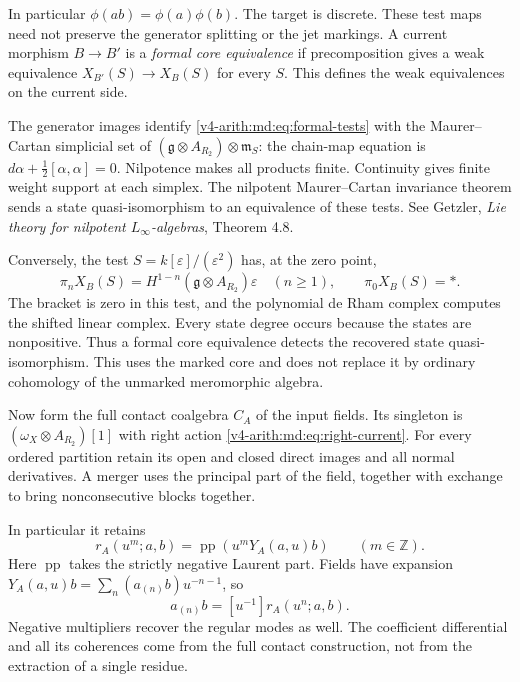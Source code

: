 In particular $\phi(ab)=\phi(a)\phi(b)$.
The target is discrete. These test maps need not
preserve the generator splitting or the jet markings.
A current morphism $B\to B'$ is a
\emph{formal core equivalence} if precomposition gives
a weak equivalence $X_{B'}(S)\to X_B(S)$ for every $S$.
This defines the weak equivalences on the current side.

The generator images identify
\eqref{v4-arith:md:eq:formal-tests} with the Maurer--Cartan
simplicial set of
$(\mathfrak g\otimes A_{R_2})\otimes\mathfrak m_S$:
the chain-map equation is $d\alpha+\tfrac12[\alpha,\alpha]=0$.
Nilpotence makes all products finite. Continuity gives
finite weight support at each simplex.
The nilpotent Maurer--Cartan invariance theorem sends a
state quasi-isomorphism to an equivalence of these tests.
See Getzler, \emph{Lie theory for nilpotent
$L_\infty$-algebras}, Theorem 4.8.

Conversely, the test $S=k[\varepsilon]/(\varepsilon^2)$
has, at the zero point,
\[
 \pi_nX_B(S)=H^{1-n}(\mathfrak g\otimes A_{R_2})\varepsilon
 \quad(n\geq1),\qquad\pi_0X_B(S)=*.
\]
The bracket is zero in this test, and the polynomial
de Rham complex computes the shifted linear complex.
Every state degree occurs because the states are
nonpositive. Thus a formal core equivalence detects
the recovered state quasi-isomorphism. This uses the
marked core and does not replace it by ordinary
cohomology of the unmarked meromorphic algebra.

Now form the full contact coalgebra $C_A$ of the input
fields. Its singleton is $(\omega_X\otimes A_{R_2})[1]$
with right action \eqref{v4-arith:md:eq:right-current}.
For every ordered partition retain its open and closed
direct images and all normal derivatives. A merger
uses the principal part of the field, together with
exchange to bring nonconsecutive blocks together.

In particular it retains
\begin{equation}\label{v4-arith:md:eq:contact-mark}
 r_A(u^m;a,b)=\operatorname{pp}(u^mY_A(a,u)b)
 \qquad(m\in\mathbb Z).
\end{equation}
Here $\operatorname{pp}$ takes the strictly negative
Laurent part. Fields have expansion
$Y_A(a,u)b=\sum_n(a_{(n)}b)u^{-n-1}$, so
\begin{equation}\label{v4-arith:md:eq:mode-recovery}
 a_{(n)}b=[u^{-1}]r_A(u^n;a,b).
\end{equation}
Negative multipliers recover the regular modes as well.
The coefficient differential and all its coherences
come from the full contact construction, not from
the extraction of a single residue.

